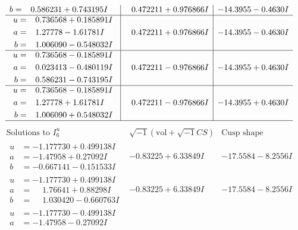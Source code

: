 \documentclass[1p]{elsarticle_modified}
\theoremstyle{definition}
\newcommand{\I}{\sqrt{-1}}
\begin{document}
$$\begin{array}{c|c|c}
\begin{aligned}
b &= \phantom{-}0.586231 + 0.743195 I\end{aligned}
 & \phantom{-}0.472211 + 0.976866 I & -14.3955 - 0.4630 I \\ \hline\begin{aligned}
u &= \phantom{-}0.736568 + 0.185891 I \\
a &= \phantom{-}1.27778 - 1.61781 I \\
b &= \phantom{-}1.006090 - 0.548032 I\end{aligned}
 & \phantom{-}0.472211 + 0.976866 I & -14.3955 - 0.4630 I \\ \hline\begin{aligned}
u &= \phantom{-}0.736568 - 0.185891 I \\
a &= \phantom{-}0.023413 - 0.480119 I \\
b &= \phantom{-}0.586231 - 0.743195 I\end{aligned}
 & \phantom{-}0.472211 - 0.976866 I & -14.3955 + 0.4630 I \\ \hline\begin{aligned}
u &= \phantom{-}0.736568 - 0.185891 I \\
a &= \phantom{-}1.27778 + 1.61781 I \\
b &= \phantom{-}1.006090 + 0.548032 I\end{aligned}
 & \phantom{-}0.472211 - 0.976866 I & -14.3955 + 0.4630 I\\
 \hline 
 \end{array}$$\newpage$$\begin{array}{c|c|c}  
\text{Solutions to }I^u_{6}& \I (\text{vol} + \sqrt{-1}CS) & \text{Cusp shape}\\
 \hline 
\begin{aligned}
u &= -1.177730 + 0.499138 I \\
a &= -1.47958 + 0.27092 I \\
b &= -0.667141 - 0.151533 I\end{aligned}
 & -0.83225 + 6.33849 I & -17.5584 - 8.2556 I \\ \hline\begin{aligned}
u &= -1.177730 + 0.499138 I \\
a &= \phantom{-}1.76641 + 0.88298 I \\
b &= \phantom{-}1.030420 - 0.660763 I\end{aligned}
 & -0.83225 + 6.33849 I & -17.5584 - 8.2556 I \\ \hline\begin{aligned}
u &= -1.177730 - 0.499138 I \\
a &= -1.47958 - 0.27092 I \\

\end{aligned}
\end{array}$$
\end{document}
